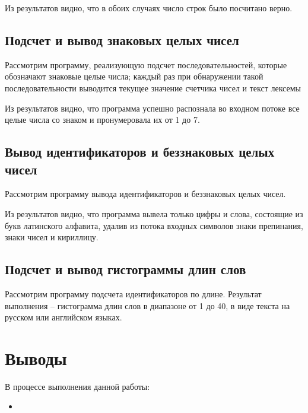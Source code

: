 
Из результатов видно, что в обоих случаях число строк было посчитано верно.

\subsection{Подсчет и вывод знаковых целых чисел}

Рассмотрим программу, реализующую подсчет последовательностей, которые обозначают знаковые целые числа; каждый раз при обнаружении такой последовательности выводится текущее значение счетчика чисел и текст лексемы



Из результатов видно, что программа успешно распознала во входном потоке все целые числа со знаком и пронумеровала их от 1 до 7.

\subsection{Вывод идентификаторов и беззнаковых целых чисел}

Рассмотрим программу вывода идентификаторов и беззнаковых целых чисел.



Из результатов видно, что программа вывела только цифры и слова, состоящие из букв латинского алфавита, удалив из потока входных символов знаки препинания, знаки чисел и кириллицу. 

\subsection{Подсчет и вывод гистограммы длин слов}

Рассмотрим программу подсчета идентификаторов по длине. Результат выполнения -- гистограмма длин слов в диапазоне от 1 до 40, в виде текста на русском или английском языках.
 



\section{Выводы}

В процессе выполнения данной работы:

\begin{itemize}
	\item 
\end{itemize}


